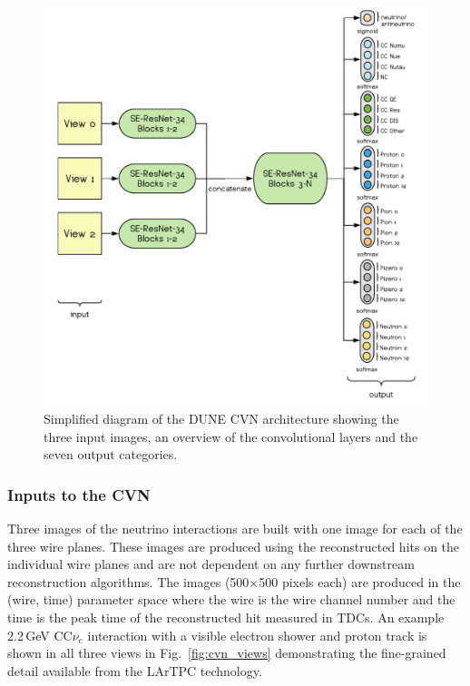 \begin{figure}
    \centering
		\includegraphics[scale=0.6]{graphics/cvn_architecture.pdf}
	\caption{Simplified diagram of the DUNE CVN architecture showing the three input images, an overview of the convolutional layers and the seven output categories.}
    \label{fig:cvnarchitecture}
\end{figure}

\subsubsection{Inputs to the CVN}
\label{sec:cvn:inputs}
Three images of the neutrino interactions are built with one image for each of the three wire planes. These images are produced using the reconstructed hits on the individual wire planes and are not dependent on any further downstream reconstruction algorithms. The images (500$\times$500 pixels each) are produced in the (wire, time) parameter space where the wire is the wire channel number and the time is the peak time of the reconstructed hit measured in TDCs. An example 2.2\,GeV CC$\nu_e$ interaction with a visible electron shower and proton track is shown in all three views in Fig.~\ref{fig:cvn_views} demonstrating the fine-grained detail available from the LArTPC technology.

